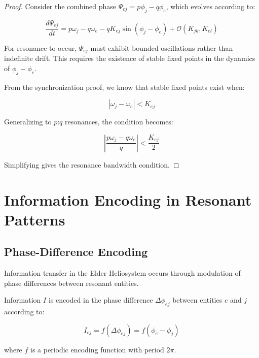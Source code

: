\begin{proof}
Consider the combined phase $\Psi_{ej} = p\phi_j - q\phi_e$, which evolves according to:

\begin{equation}
\frac{d\Psi_{ej}}{dt} = p\omega_j - q\omega_e - qK_{ej}\sin(\phi_j - \phi_e) + \mathcal{O}(K_{jk}, K_{el})
\end{equation}

For resonance to occur, $\Psi_{ej}$ must exhibit bounded oscillations rather than indefinite drift. This requires the existence of stable fixed points in the dynamics of $\phi_j - \phi_e$.

From the synchronization proof, we know that stable fixed points exist when:

\begin{equation}
|\omega_j - \omega_e| < K_{ej}
\end{equation}

Generalizing to $p$:$q$ resonances, the condition becomes:

\begin{equation}
\left|\frac{p\omega_j - q\omega_e}{q}\right| < \frac{K_{ej}}{2}
\end{equation}

Simplifying gives the resonance bandwidth condition.
\end{proof}

\section{Information Encoding in Resonant Patterns}

\subsection{Phase-Difference Encoding}

Information transfer in the Elder Heliosystem occurs through modulation of phase differences between resonant entities.

\begin{definition}
Information $I$ is encoded in the phase difference $\Delta\phi_{ej}$ between entities $e$ and $j$ according to:

\begin{equation}
I_{ej} = f(\Delta\phi_{ej}) = f(\phi_e - \phi_j)
\end{equation}

where $f$ is a periodic encoding function with period $2\pi$.
\end{definition}

